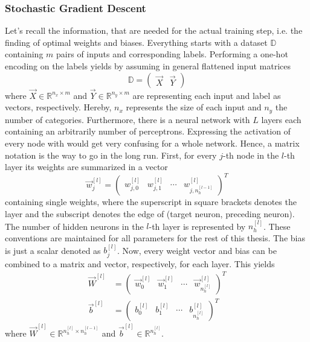 \subsubsection{Stochastic Gradient Descent}
\label{sec:training-stochastic-gradient}
Let's recall the information, that are needed for the actual training step, i.e. the finding of optimal weights and biases.
Everything starts with a dataset $\mathbb{D}$ containing $m$ pairs of inputs and corresponding labels.
Performing a one-hot encoding on the labels yields by assuming in general flattened input matrices
\begin{equation}
	\label{eq:dataset-one-hot}
	\mathbb{D} =
	\begin{pmatrix}
		\vec{X} & \vec{Y}
	\end{pmatrix}
\end{equation}
where $\vec{X} \in \mathbb{R}^{n_x \times m}$ and $\vec{Y} \in \mathbb{R}^{n_y \times m}$ are representing each input and label as vectors, respectively.
Hereby, $n_x$ represents the size of each input and $n_y$ the number of categories.
Furthermore, there is a neural network with $L$ layers each containing an arbitrarily number of perceptrons.
Expressing the activation of every node with  would get very confusing for a whole network.
Hence, a matrix notation is the way to go in the long run.
First, for every $j$-th node in the $l$-th layer its weights are summarized in a vector
\begin{equation}
	\label{eq:weights-vector}
	\vec{w}^{[l]}_j =
	\begin{pmatrix}
		w^{[l]}_{j,0} & w^{[l]}_{j,1} & \cdots & w^{[l]}_{j,n^{[l-1]}_h}
	\end{pmatrix}^T
\end{equation}
containing single weights, where the superscript in square brackets denotes the layer and the subscript denotes the edge of (target neuron, preceding neuron).
The number of hidden neurons in the $l$-th layer is represented by $n^{[l]}_h$.
These conventions are maintained for all parameters for the rest of this thesis.
The bias is just a scalar denoted as $b^{[l]}_j$. 
Now, every weight vector and bias can be combined to a matrix and vector, respectively, for each layer.
This yields
\begin{subequations}
\label{eq:parameters}
	\begin{align}
		\vec{W}^{[l]} &=
		\begin{pmatrix}
			\vec{w}^{[l]}_0 & \vec{w}^{[l]}_1 & \cdots & \vec{w}^{[l]}_{n^{[l]}_h}
		\end{pmatrix}^T
		\label{eq:weights}
		\\
		\vec{b}^{[l]} &=
			\begin{pmatrix}
				b^{[l]}_0 & b^{[l]}_1 & \cdots & b^{[l]}_{n^{[l]}_h}
			\end{pmatrix}^T
		\label{eq:biases}
	\end{align}
\end{subequations}
where $\vec{W}^{[l]} \in \mathbb{R}^{n^{[l]}_h \times n^{[l-1]}_h}$ and $\vec{b}^{[l]} \in \mathbb{R}^{n^{[l]}_h}$.

